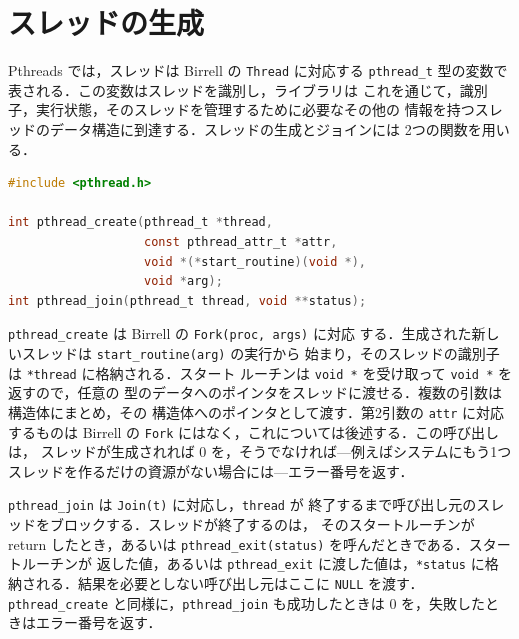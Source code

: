 \documentclass[../main.tex]{subfiles}
\begin{document}
\section{スレッドの生成}
\label{sec:l04-creation}

Pthreads では，スレッドは Birrell の \texttt{Thread} に対応する
\texttt{pthread\_t} 型の変数で表される．この変数はスレッドを識別し，ライブラリは
これを通じて，識別子，実行状態，そのスレッドを管理するために必要なその他の
情報を持つスレッドのデータ構造に到達する．スレッドの生成とジョインには
2つの関数を用いる．
\begin{lstlisting}[language=C, numbers=none]
#include <pthread.h>

int pthread_create(pthread_t *thread,
                   const pthread_attr_t *attr,
                   void *(*start_routine)(void *),
                   void *arg);
int pthread_join(pthread_t thread, void **status);
\end{lstlisting}

\texttt{pthread\_create} は Birrell の \texttt{Fork(proc, args)} に対応
する．生成された新しいスレッドは \texttt{start\_routine(arg)} の実行から
始まり，そのスレッドの識別子は \texttt{*thread} に格納される．スタート
ルーチンは \texttt{void~*} を受け取って \texttt{void~*} を返すので，任意の
型のデータへのポインタをスレッドに渡せる．複数の引数は構造体にまとめ，その
構造体へのポインタとして渡す．第2引数の \texttt{attr} に対応するものは
Birrell の \texttt{Fork} にはなく，これについては後述する．この呼び出しは，
スレッドが生成されれば 0 を，そうでなければ---例えばシステムにもう1つ
スレッドを作るだけの資源がない場合には---エラー番号を返す．

\texttt{pthread\_join} は \texttt{Join(t)} に対応し，\texttt{thread} が
終了するまで呼び出し元のスレッドをブロックする．スレッドが終了するのは，
そのスタートルーチンが return したとき，あるいは
\texttt{pthread\_exit(status)} を呼んだときである．スタートルーチンが
返した値，あるいは \texttt{pthread\_exit} に渡した値は，\texttt{*status}
に格納される．結果を必要としない呼び出し元はここに \texttt{NULL} を渡す．
\texttt{pthread\_create} と同様に，\texttt{pthread\_join} も成功したときは
0 を，失敗したときはエラー番号を返す．
\end{document}
